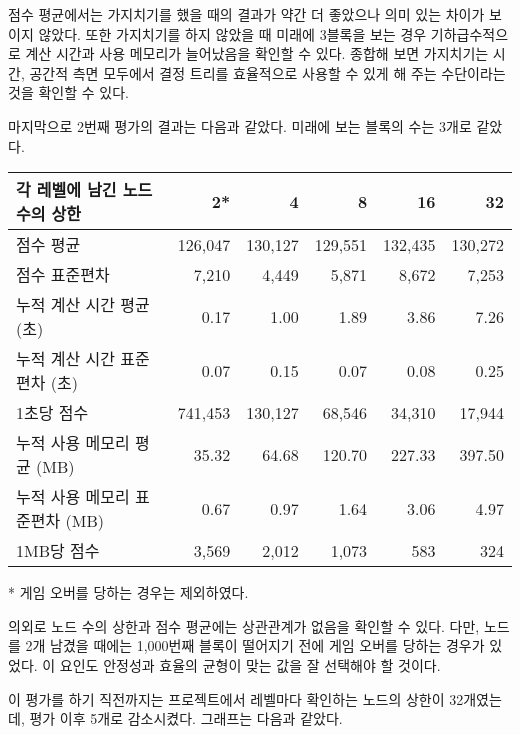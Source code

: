 점수 평균에서는 가지치기를 했을 때의 결과가 약간 더 좋았으나 의미 있는 차이가 보이지 않았다.
또한 가지치기를 하지 않았을 때 미래에 3블록을 보는 경우 기하급수적으로 계산 시간과 사용 메모리가
늘어났음을 확인할 수 있다. 종합해 보면 가지치기는 시간, 공간적 측면 모두에서 결정 트리를
효율적으로 사용할 수 있게 해 주는 수단이라는 것을 확인할 수 있다.

마지막으로 2번째 평가의 결과는 다음과 같았다. 미래에 보는 블록의 수는 3개로 같았다.
\begin{center}
    \begin{tabular}{l|r|r|r|r|r}
        각 레벨에 남긴 노드 수의 상한 & 2* & 4 & 8 & 16 & 32 \\
        \hline
        점수 평균 & 126,047 & 130,127 & 129,551 & 132,435 & 130,272 \\
        점수 표준편차 & 7,210 & 4,449 & 5,871 & 8,672 & 7,253 \\
        \hline
        누적 계산 시간 평균 (초) & 0.17 & 1.00 & 1.89 & 3.86 & 7.26 \\
        누적 계산 시간 표준편차 (초) & 0.07 & 0.15 & 0.07 & 0.08 & 0.25 \\
        1초당 점수 & 741,453 & 130,127 & 68,546 & 34,310 & 17,944 \\
        \hline
        누적 사용 메모리 평균 (MB) & 35.32 & 64.68 & 120.70 & 227.33 & 397.50 \\
        누적 사용 메모리 표준편차 (MB) & 0.67 & 0.97 & 1.64 & 3.06 & 4.97 \\
        1MB당 점수 & 3,569 & 2,012 & 1,073 & 583 & 324 \\
    \end{tabular}
\end{center}
* 게임 오버를 당하는 경우는 제외하였다.

의외로 노드 수의 상한과 점수 평균에는 상관관계가 없음을 확인할 수 있다. 다만, 노드를 2개
남겼을 때에는 1,000번째 블록이 떨어지기 전에 게임 오버를 당하는 경우가 있었다. 이 요인도
안정성과 효율의 균형이 맞는 값을 잘 선택해야 할 것이다.

이 평가를 하기 직전까지는 프로젝트에서 레벨마다 확인하는 노드의 상한이 32개였는데,
평가 이후 5개로 감소시켰다. 그래프는 다음과 같았다.

